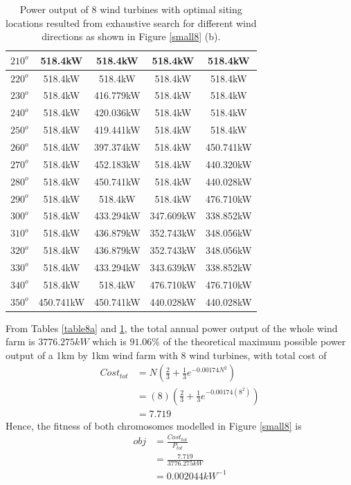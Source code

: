 \begin{table}[H]
\begin{tabular}{|c|c|c|c|c|}
        		$210^o$	& 518.4kW	& 518.4kW	& 518.4kW	& 518.4kW	\\ \hline
        		$220^o$	& 518.4kW	& 518.4kW	& 518.4kW	& 518.4kW	\\ \hline
        		$230^o$	& 518.4kW	& 416.779kW	& 518.4kW	& 518.4kW	\\ \hline
        		$240^o$	& 518.4kW	& 420.036kW	& 518.4kW	& 518.4kW	\\ \hline
        		$250^o$	& 518.4kW	& 419.441kW	& 518.4kW	& 518.4kW	\\ \hline
        		$260^o$	& 518.4kW	& 397.374kW	& 518.4kW	& 450.741kW	\\ \hline
        		$270^o$	& 518.4kW	& 452.183kW	& 518.4kW	& 440.320kW	\\ \hline
        		$280^o$	& 518.4kW	& 450.741kW	& 518.4kW	& 440.028kW	\\ \hline
        		$290^o$	& 518.4kW	& 518.4kW	& 518.4kW	& 476.710kW	\\ \hline
        		$300^o$	& 518.4kW	& 433.294kW	& 347.609kW	& 338.852kW	\\ \hline
        		$310^o$	& 518.4kW	& 436.879kW	& 352.743kW	& 348.056kW	\\ \hline
        		$320^o$	& 518.4kW	& 436.879kW	& 352.743kW	& 348.056kW	\\ \hline
        		$330^o$ & 518.4kW	& 433.294kW	& 343.639kW	& 338.852kW	\\ \hline
        		$340^o$	& 518.4kW	& 518.4kW	& 476.710kW	& 476.710kW	\\ \hline
        		$350^o$	& 450.741kW	& 450.741kW	& 440.028kW	& 440.028kW	\\ \hline
        	\end{tabular}
        	\caption{Power output of 8 wind turbines with optimal siting locations resulted from exhaustive search for different wind directions as shown in Figure \ref{small8} (b).}
        	\label{table8b}
        \end{table}
        \doublespacing
        
        From Tables \ref{table8a} and \ref{table8b}, the total annual power output of the whole wind farm is $3776.275kW$ which is $91.06\%$ of the theoretical maximum possible power output of a 1km by 1km wind farm with 8 wind turbines, with total cost of
        \begin{align*}
            Cost_{tot}
            &= N\left(\frac{2}{3} + \frac{1}{3}e^{-0.00174N^2}\right) \\
            &= \left(8\right)\left(\frac{2}{3} + \frac{1}{3}e^{-0.00174\left(8^2\right)}\right) \\
            &= 7.719
        \end{align*}
        Hence, the fitness of both chromosomes modelled in Figure \ref{small8} is
        \begin{align*}
            obj
            &=\frac{Cost_{tot}}{P_{tot}} \\
            &=\frac{7.719}{3776.275kW} \\
            &=0.002044kW^{-1}
        \end{align*} 
        
